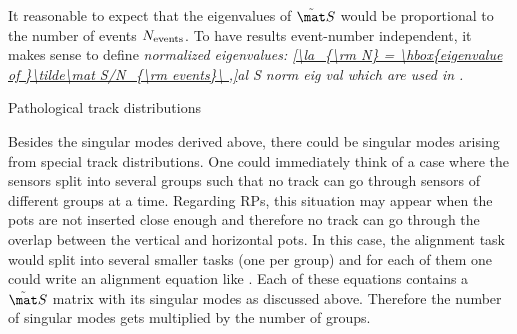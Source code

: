 It reasonable to expect that the eigenvalues of $\tilde\mat S$ would be proportional to the number of events $N_{\rm events}$. To have results event-number independent, it makes sense to define \em{normalized eigenvalues}:
\eqref{\la_{\rm N} = \hbox{eigenvalue of }\tilde\mat S/N_{\rm events}\ ,}{al S norm eig val}
which are used in .



\caption{Pathological track distributions}

Besides the singular modes derived above, there could be singular modes arising from special track distributions. One could immediately think of a case where the sensors split into several groups such that no track can go through sensors of different groups at a time. Regarding RPs, this situation may appear when the pots are not inserted close enough and therefore no track can go through the overlap between the vertical and horizontal pots. In this case, the alignment task would split into several smaller tasks (one per group) and for each of them one could write an alignment equation like . Each of these equations contains a $\tilde\mat S$ matrix with its singular modes as discussed above. Therefore the number of singular modes gets multiplied by the number of groups.

